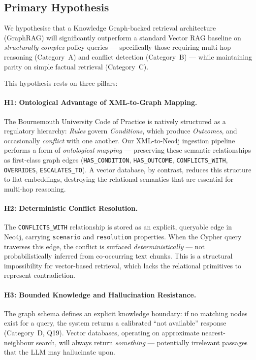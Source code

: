 \subsection{Primary Hypothesis}

We hypothesise that a Knowledge Graph-backed retrieval architecture (GraphRAG) will significantly outperform a standard Vector RAG baseline on \textit{structurally complex} policy queries — specifically those requiring multi-hop reasoning (Category~A) and conflict detection (Category~B) — while maintaining parity on simple factual retrieval (Category~C).

This hypothesis rests on three pillars:

\paragraph{H1: Ontological Advantage of XML-to-Graph Mapping.}
The Bournemouth University Code of Practice is natively structured as a regulatory hierarchy: \textit{Rules} govern \textit{Conditions}, which produce \textit{Outcomes}, and occasionally \textit{conflict} with one another. Our XML-to-Neo4j ingestion pipeline performs a form of \textit{ontological mapping} — preserving these semantic relationships as first-class graph edges (\texttt{HAS\_CONDITION}, \texttt{HAS\_OUTCOME}, \texttt{CONFLICTS\_WITH}, \texttt{OVERRIDES}, \texttt{ESCALATES\_TO}). A vector database, by contrast, reduces this structure to flat embeddings, destroying the relational semantics that are essential for multi-hop reasoning.

\paragraph{H2: Deterministic Conflict Resolution.}
The \texttt{CONFLICTS\_WITH} relationship is stored as an explicit, queryable edge in Neo4j, carrying \texttt{scenario} and \texttt{resolution} properties. When the Cypher query traverses this edge, the conflict is surfaced \textit{deterministically} — not probabilistically inferred from co-occurring text chunks. This is a structural impossibility for vector-based retrieval, which lacks the relational primitives to represent contradiction.

\paragraph{H3: Bounded Knowledge and Hallucination Resistance.}
The graph schema defines an explicit knowledge boundary: if no matching nodes exist for a query, the system returns a calibrated ``not available'' response (Category~D, Q19). Vector databases, operating on approximate nearest-neighbour search, will always return \textit{something} — potentially irrelevant passages that the LLM may hallucinate upon.

